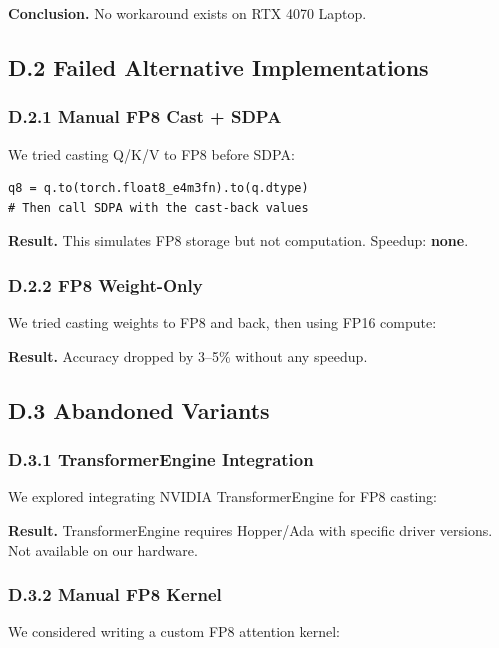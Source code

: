 \textbf{Conclusion.} No workaround exists on RTX 4070 Laptop.

\subsection{D.2 Failed Alternative Implementations}

\subsubsection{D.2.1 Manual FP8 Cast + SDPA}

We tried casting Q/K/V to FP8 before SDPA:

\begin{lstlisting}
q8 = q.to(torch.float8_e4m3fn).to(q.dtype)
# Then call SDPA with the cast-back values
\end{lstlisting}

\textbf{Result.} This simulates FP8 storage but not computation. Speedup: \textbf{none}.

\subsubsection{D.2.2 FP8 Weight-Only}

We tried casting weights to FP8 and back, then using FP16 compute:

\textbf{Result.} Accuracy dropped by 3--5\% without any speedup.

\subsection{D.3 Abandoned Variants}

\subsubsection{D.3.1 TransformerEngine Integration}

We explored integrating NVIDIA TransformerEngine for FP8 casting:

\textbf{Result.} TransformerEngine requires Hopper/Ada with specific driver 
versions. Not available on our hardware.

\subsubsection{D.3.2 Manual FP8 Kernel}

We considered writing a custom FP8 attention kernel:

